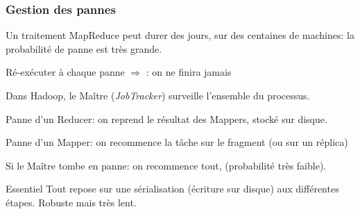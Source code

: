 \begin{frame}
\frametitle{Gestion des pannes}

Un traitement MapReduce peut durer des jours, sur des centaines de machines:
la probabilité de panne est très grande.

\vfill

Ré-exécuter à chaque panne $\Rightarrow$ : on ne finira jamais
\vfill

Dans Hadoop, le Maître (\textit{JobTracker}) surveille l'ensemble du processus.

\medskip

\begin{redbullet}
  \item Panne d'un Reducer: on  reprend le résultat des Mappers, \alert{stocké sur disque}.

  \item Panne d'un Mapper: on recommence la tâche sur le fragment (\alert{ou sur un réplica})
  \item Si le Maître tombe en panne: on recommence tout, (probabilité très faible).

\end{redbullet}

\begin{remblock}{Essentiel}
Tout repose sur une \alert{sérialisation} (écriture sur disque) aux différentes
étapes. \alert{Robuste mais très lent}.
\end{remblock}
\end{frame}
